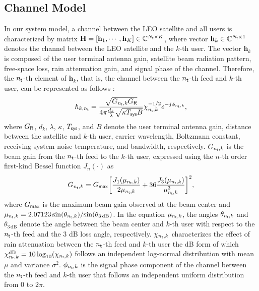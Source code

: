 \documentclass[draftclsnofoot, onecolumn, comsoc, 12pt]{IEEEtran}
\begin{document}
\subsection{Channel Model}
{In our system model, a channel between the LEO satellite and all users is characterized by matrix $\mathbf{H} = [\mathbf{h}_1, \cdots, \mathbf{h}_K] \in \mathbb{C}^{N_{\sf{t}} \times K}$, where vector $\mathbf{h}_k\in \mathbb{C}^{{N_{\sf{t}}}\times{1}}$ denotes the channel between the LEO satellite and the $k$-th user.}
The vector $\mathbf{h}_k$ is composed of the user terminal antenna gain, satellite beam radiation pattern, free-space loss, rain attenuation gain, and signal phase of the channel. 
Therefore, the $n_{\sf{t}}$-th element of $\mathbf{h}_k$, that is, the channel between the $n_{\sf{t}}$-th feed and $k$-th user, can be represented as follows \cite{yin2020rate_J, 7091022}:
\begin{align}\label{channel_Eq1}
h_{k,n_{\sf{t}}} = \frac{\sqrt{G_{{n_{\sf{t}}}, k}{G_{\sf R}}}}
{4\pi \frac{d_k}{\lambda} \sqrt{\kappa {T_{\sf sys}} {B}}} {\chi}_{n_{\sf{t}}, k}^{-1/2}e^{-j\phi_{n_{\sf{t}},k}}, 
\end{align}
where $G_{\sf R}$, $d_k$, $\lambda$, $\kappa$, $T_{\sf sys}$, and $B$ denote the user terminal antenna gain, distance between the satellite and $k$-th user, carrier wavelength, Boltzmann constant, receiving system noise temperature, and bandwidth, respectively.
$G_{{n_{\sf{t}}},k}$ is the beam gain from the $n_{\sf{t}}$-th feed to the $k$-th user, expressed using the $n$-th order first-kind Bessel function $J_{n}(\cdot)$ as  
\begin{align}\label{channelEq_2}
G_{{n_{\sf{t}}},k}=G_{\sf{max}}\bigg[\frac{J_{1}(\mu_{n_{\sf{t}},k})}{2\mu_{n_{\sf{t}},k}} + 36 \frac{J_{3}(\mu_{n_{\sf{t}},k})}{\mu_{n_{\sf{t}},k}^{3}}\bigg]^{2}, 
\end{align}
where $G_{\sf max}$ is the maximum beam gain observed at the beam center and $\mu_{n_{\sf{t}},k} = 2.07123 \, \mathrm{sin}(\theta_{{n_{\sf{t}}},{k}})/\mathrm{sin}(\theta_{3 \, \mathrm{dB}})$. 
In the equation $\mu_{n_{\sf{t}},k}$, the angles $\theta_{{n_{\sf{t}}},{k}}$ and $\theta_{3 \, \mathrm{dB}}$ denote the angle between the beam center and $k$-th user with respect to the $n_{\sf{t}}$-th feed and the 3 dB loss angle, respectively.
${\chi}_{n_{\sf{t}}, k}$ characterizes the effect of rain attenuation between the $n_{\sf{t}}$-th feed and $k$-th user the dB form of which ${\chi}_{n_{\sf{t}}, k}^{\mathrm{dB}}=10\log_{10}({\chi}_{n_{\sf{t}}, k})$ follows an independent log-normal distribution with mean $\mu$ and variance $\sigma^{2}$. $\phi_{n_{\sf{t}},k}$ is the signal phase component of the channel between the $n_{\sf{t}}$-th feed and $k$-th user that follows an independent uniform distribution from $0$ to $2\pi$.
\end{document}
